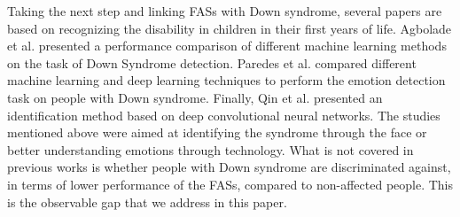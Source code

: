 Taking the next step and linking FASs with Down syndrome, several papers are based on recognizing the disability in children in their first years of life.
Agbolade et al. \cite{agboladeSyndromeFaceRecognition2020} presented a performance comparison of different machine learning methods on the task of Down Syndrome detection.
Paredes et al. \cite{paredesEmotionRecognitionSyndrome2022} compared different machine learning and deep learning techniques to perform the emotion detection task on people with Down syndrome.
Finally, Qin et al. \cite{qinAutomaticIdentificationSyndrome2020} presented an identification method based on deep convolutional neural networks. 
The studies mentioned above were aimed at identifying the syndrome through the face or better understanding emotions through technology. 
What is not covered in previous works is whether people with Down syndrome are discriminated against, in terms of lower performance of the FASs, compared to non-affected people.
This is the observable gap that we address in this paper.

